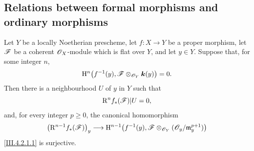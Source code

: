 \subsection{Relations between formal morphisms and ordinary morphisms}
\label{subsection:III.4.6}

\begin{proposition}[4.6.1]
\label{III.4.6.1}
Let $Y$ be a locally Noetherian prescheme, let $f:X\to Y$ be a
proper morphism, let $\mathscr{F}$ be a coherent $\mathscr{O}_X$-module which
is flat over $Y$, and let $y\in Y$.  Suppose that, for some integer
$n$,
\[
  \mathrm{H}^n\bigl(f^{-1}(y),
    \mathscr{F}\otimes_{\mathscr{O}_Y}\boldsymbol{k}(y)\bigr)=0.
\]
Then there is a neighbourhood $U$ of $y$ in $Y$ such that
\[
  \mathrm{R}^n f_*(\mathscr{F})|U=0,
\]
and, for every integer $p\geq0$, the canonical homomorphism
\[
  \bigl(\mathrm{R}^{n-1}f_*(\mathscr{F})\bigr)_y
  \longrightarrow
  \mathrm{H}^{n-1}\bigl(f^{-1}(y),
    \mathscr{F}\otimes_{\mathscr{O}_Y}
      (\mathscr{O}_y/\mathfrak m_y^{p+1})\bigr)
\]
\eqref{III.4.2.1.1} is surjective.
\end{proposition}

